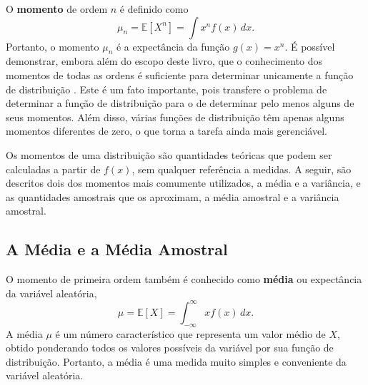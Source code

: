 O \textbf{momento} de ordem $n$ é definido como
\begin{equation}
\mu_n = \mathbb{E}[X^n] =  \int x^n f(x)\, dx.
\end{equation}
Portanto, o momento $\mu_n$ é a expectância da função $g(x) = x^n$. É possível demonstrar, embora além do escopo deste livro, que o conhecimento dos momentos de todas as ordens é suficiente para determinar unicamente a função de distribuição \citep{wilks1947mathematical}. Este é um fato importante, pois transfere o problema de determinar a função de distribuição para o de determinar pelo menos alguns de seus momentos. Além disso, várias funções de distribuição têm apenas alguns momentos diferentes de zero, o que torna a tarefa ainda mais gerenciável.

Os momentos de uma distribuição são quantidades teóricas que podem ser calculadas a partir de  $f(x)$, sem qualquer referência a medidas. A seguir, são descritos dois dos momentos mais comumente utilizados, a média e a variância, e as quantidades amostrais que os aproximam, a média amostral e a variância amostral.

\subsection{A Média e a Média Amostral}

O momento de primeira ordem também é conhecido como \textbf{média} ou expectância da variável aleatória,
\begin{equation}\label{2.7}
	\mu = \mathbb{E}[X] = \int_{-\infty}^{\infty} x f(x)\, dx.
\end{equation}
A média $\mu$ é um número característico que representa um valor médio de $X$, obtido ponderando todos os valores possíveis da variável por sua função de distribuição. Portanto, a média é uma medida muito simples e conveniente da variável aleatória.

